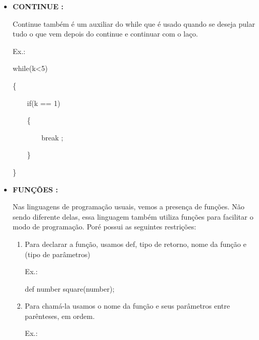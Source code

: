 \documentclass[a4paper]{article}
\begin{document}
{{{{\begin{itemize}
\newpage %
            
        \item \textbf{CONTINUE :}
            
            Continue também é um auxiliar do while que é
            usado quando se deseja pular tudo o que vem
            depois do continue e continuar com o laço.
            
            \textcolor{NavyBlue}{Ex.:}
            
            while(k<5)
            
            \{
            
            \ \ \ \ if(k == 1)
              
            \ \ \ \ \{
              
            \ \ \ \ \ \ \ \ \textcolor{NavyBlue}{break}
                    ;
              
            \ \ \ \ \}
           
            \}
        
        \bigskip   
                   
        \item \textbf{FUNÇÕES :}
            
            Nas linguagens de programação usuais, vemos a
            presença de funções.
            Não sendo diferente delas, essa linguagem também
            utiliza funções para facilitar o modo de programação.
            Poré possui as seguintes restrições:
                       
            \begin{enumerate}
                
                \item Para declarar a função, usamos 
           	    \textcolor{NavyBlue}{def}, tipo de retorno, nome
            	da função e (tipo de parâmetros)
            	
            	\textcolor{NavyBlue}{Ex.:}
            	
            	\textcolor{NavyBlue}{def}
            	number square(number);
            	
            	\bigskip

                \item Para chamá-la usamos
                o nome da função e seus parâmetros entre 
                parênteses, em ordem.
                
                \textcolor{NavyBlue}{Ex.:}
                

\end{enumerate}
\end{itemize}}}}}
\end{document}
